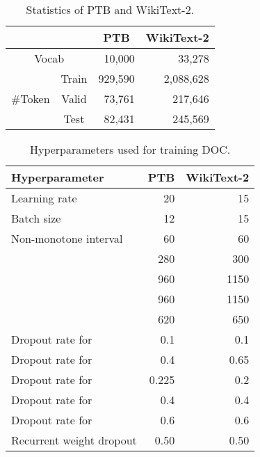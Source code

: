 \documentclass[11pt,a4paper]{article}
\begin{document}
\begin{table}[!t]
  \centering
  \small
  \begin{tabular}{| c c | r | r |} \hline
  \multicolumn{2}{|c|}{} & \multicolumn{1}{c|}{PTB} & \multicolumn{1}{c|}{WikiText-2} \\ \hline
  \multicolumn{2}{|c|}{Vocab} & 10,000 & 33,278 \\ \hline
   & Train & 929,590 & 2,088,628 \\
   \#Token & Valid & 73,761 & 217,646 \\
   & Test & 82,431 & 245,569 \\ \hline
  \end{tabular}
  \caption{Statistics of PTB and WikiText-2.\label{tab:dataset}}
\end{table}


\begin{table}[!t]
  \centering
  \small
  \begin{tabular}{| l | r | r |} \hline
  Hyperparameter & PTB & WikiText-2 \\ \hline
  Learning rate & 20 & 15 \\
  Batch size & 12 & 15 \\
  Non-monotone interval & 60 & 60 \\
   & 280 & 300 \\
   & 960 & 1150 \\
   & 960 & 1150 \\
   & 620 & 650 \\ \hline
  Dropout rate for  & 0.1 & 0.1 \\
  Dropout rate for  & 0.4 & 0.65 \\
  Dropout rate for  & 0.225 & 0.2 \\
  Dropout rate for  & 0.4 & 0.4 \\
  Dropout rate for  & 0.6 & 0.6 \\
  Recurrent weight dropout & 0.50 & 0.50 \\ \hline
  \end{tabular}
  \caption{Hyperparameters used for training DOC.\label{tab:hyperparameters}}
\end{table}
\end{document}
